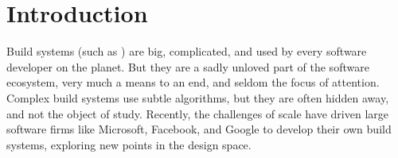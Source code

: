 \section{Introduction}\label{sec-intro}

Build systems (such as \Make) are big, complicated, and used by every
software developer on the planet.  But they are a sadly unloved part
of the software ecosystem, very much a means to an end, and seldom the
focus of attention.
Complex build systems use subtle algorithms, but they
are often hidden away, and not the object of study.
Recently, the challenges of scale have driven large software firms
like Microsoft, Facebook, and Google to develop their own build
systems, exploring new points in the design space.

